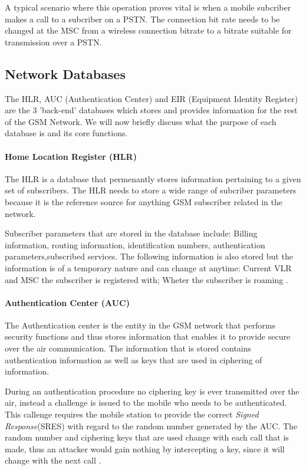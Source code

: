 A typical scenario where this operation proves vital is when a mobile subcriber makes a call to a subcriber on a PSTN. The connection bit rate needs to be changed at the MSC from a wireless connection bitrate to a bitrate suitable for transmission over a PSTN.

\subsection{Network Databases}
The HLR, AUC (Authentication Center) and EIR (Equipment Identity Register) are the 3 'back-end' databases which stores and provides information for the rest of the GSM Network. We will now briefly discuss what the purpose of each database is and its core functions.

\paragraph{Home Location Register (HLR)}
The HLR is a database that permenantly stores information pertaining to a given set of subscribers. The HLR needs to store a wide range of subcriber parameters because it is the reference source for anything GSM subscriber related in the network. 

Subscriber parameters that are stored in the database include: Billing information, routing information, identification numbers, authentication parameters,subscribed services. The following information is also stored but the information is of a temporary nature and can change at anytime: Current VLR and MSC the subscriber is registered with; Wheter the subscriber is roaming \cite{GSMSysEngin}.

\paragraph{Authentication Center (AUC)}
The Authentication center is the entity in the GSM network that performs security functions and thus stores information that enables it to provide secure over the air communication. The information that is stored contains authentication information as well as keys that are used in ciphering of information.

During an authentication procedure no ciphering key is ever transmitted over the air, instead a challenge is issued to the mobile who needs to be authenticated. This callenge requires the mobile station to provide the correct \emph{Signed Response}(SRES) with regard to the random number generated by the AUC. The random number and ciphering keys that are used change with each call that is made, thus an attacker would gain nothing by intercepting a key, since it will change with the next call \cite{GSMSysEngin}.

